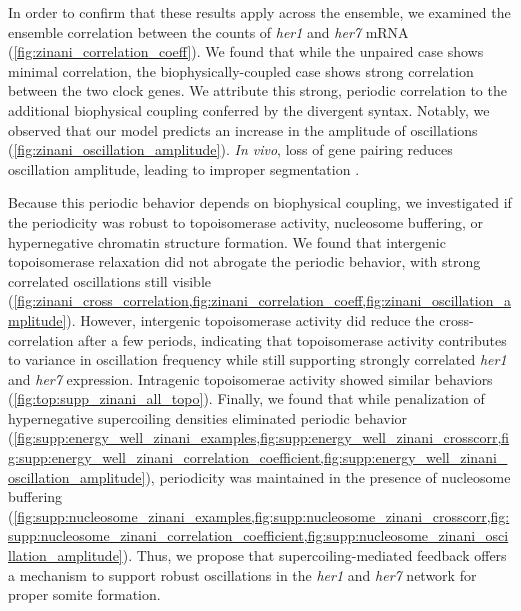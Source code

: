 \documentclass[11pt]{article}
\begin{document}
In order to confirm that these results apply across the ensemble, we examined the ensemble correlation between the counts of \textit{her1} and \textit{her7} mRNA (\cref{fig:zinani_correlation_coeff}). We found that while the unpaired case shows minimal correlation, the biophysically-coupled case shows strong correlation between the two clock genes. We attribute this strong, periodic correlation to the additional biophysical coupling conferred by the divergent syntax. Notably, we observed that our model predicts an increase in the amplitude of oscillations (\cref{fig:zinani_oscillation_amplitude}). \textit{In vivo}, loss of gene pairing reduces oscillation amplitude, leading to improper segmentation \parencite{zinaniPairingSegmentationClock2021}. 

Because this periodic behavior depends on biophysical coupling, we investigated if the periodicity was robust to topoisomerase activity, nucleosome buffering, or hypernegative chromatin structure formation. We found that intergenic topoisomerase relaxation did not abrogate the periodic behavior, with strong correlated oscillations still visible (\cref{fig:zinani_cross_correlation,fig:zinani_correlation_coeff,fig:zinani_oscillation_amplitude}). However, intergenic topoisomerase activity did reduce the cross-correlation after a few periods, indicating that topoisomerase activity contributes to variance in oscillation frequency while still supporting strongly correlated \emph{her1} and \emph{her7} expression. Intragenic topoisomerae activity showed similar behaviors (\cref{fig:top:supp_zinani_all_topo}). Finally, we found that while penalization of hypernegative supercoiling densities eliminated periodic behavior (\cref{fig:supp:energy_well_zinani_examples,fig:supp:energy_well_zinani_crosscorr,fig:supp:energy_well_zinani_correlation_coefficient,fig:supp:energy_well_zinani_oscillation_amplitude}), periodicity was maintained in the presence of nucleosome buffering (\cref{fig:supp:nucleosome_zinani_examples,fig:supp:nucleosome_zinani_crosscorr,fig:supp:nucleosome_zinani_correlation_coefficient,fig:supp:nucleosome_zinani_oscillation_amplitude}).
Thus, we propose that supercoiling-mediated feedback offers a mechanism to support robust oscillations in the \textit{her1} and \textit{her7} network for proper somite formation. 


\FloatBarrier
\end{document}
